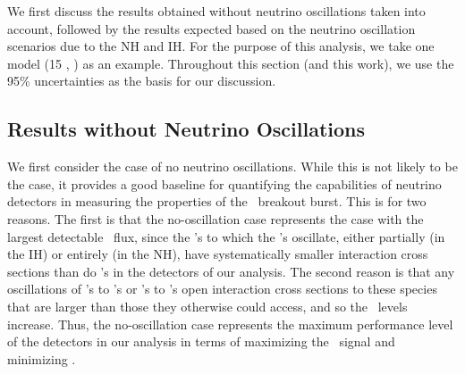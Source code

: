 
We first discuss the results obtained without neutrino oscillations
taken into account, followed by the results expected based on the
neutrino oscillation scenarios due to the NH and IH. For
the purpose of this analysis, we take one model (15 \Msol, \ls) as an
example. 
Throughout this section (and this work), we use the 95\% uncertainties
as the basis for our discussion.

\subsection{Results without Neutrino Oscillations}

We first consider the case of no neutrino oscillations.  While this is
not likely to be the case, it provides a good baseline for
quantifying the capabilities of neutrino detectors in measuring the
properties of the \nue\ breakout burst.  This
is for two reasons. The first is that the no-oscillation case 
represents the case with
the largest detectable \nue\ flux, since the \nuxpart's to which the \nue's
oscillate, either partially (in the IH) or entirely (in the NH), 
have systematically smaller interaction cross sections
than do \nue's in the detectors of our analysis. The 
second reason is that 
any oscillations of \nuxpart's to \nue's or \nuxanti's to \anue's open 
interaction cross sections to these species that are larger than those 
they otherwise could access, and so the \background\ levels increase.
 Thus, the no-oscillation case represents the
maximum performance level of the detectors in our analysis in terms of
maximizing the \nue\ signal and minimizing \backgrounds.

